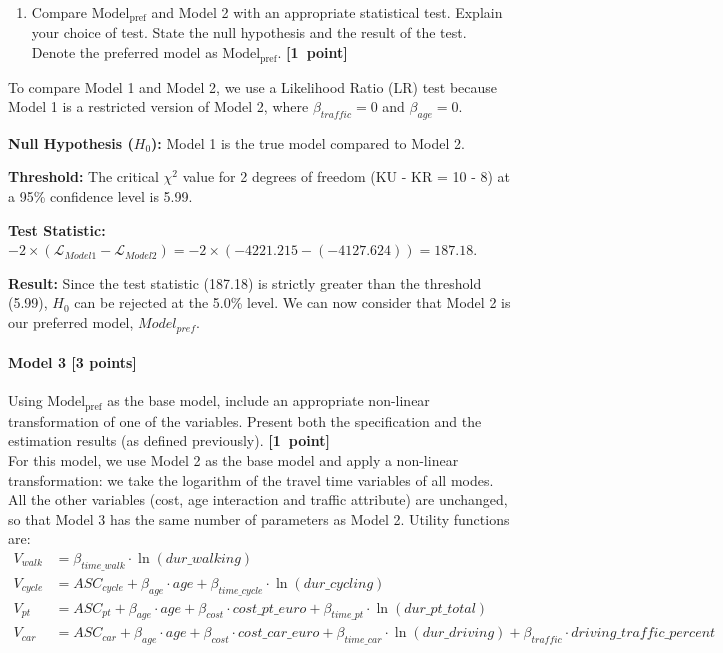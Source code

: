 \documentclass[11pt,a4paper]{article}
\begin{document}
\begin{enumerate}[resume]
	\item Compare $\text{Model}_\text{pref}$ and Model 2 with an appropriate statistical test. Explain your choice of test. State the null hypothesis and the result of the test. Denote the preferred model as $\text{Model}_\text{pref}$. \textbf{[1~point]}
\end{enumerate}

To compare Model 1 and Model 2, we use a Likelihood Ratio (LR) test because Model 1 is a restricted version of Model 2, where $\beta_{traffic} = 0$ and $\beta_{age} = 0$.
\begin{description}
    \item \textbf{Null Hypothesis ($H_0$):} Model 1 is the true model compared to Model 2.
    \item \textbf{Threshold:} The critical $\chi^2$ value for 2 degrees of freedom (KU - KR = 10 - 8) at a 95\% confidence level is 5.99.
    \item \textbf{Test Statistic:} $-2 \times (\mathcal{L}_{Model1} - \mathcal{L}_{Model2}) = -2 \times (-4221.215 - (-4127.624)) = 187.18$.
    \item \textbf{Result:} Since the test statistic (187.18) is strictly greater than the threshold (5.99), $H_0$ can be rejected at the 5.0\% level. 
We can now consider that Model 2 is our preferred model, $Model_{pref}$. 
\end{description}

\paragraph{Model 3 [3 points]} Using $\text{Model}_\text{pref}$ as the base model, include an appropriate non-linear transformation of one of the variables. Present both the specification and the estimation results (as defined previously). \textbf{[1~point]}\\

For this model, we use Model 2 as the base model and apply a non-linear transformation: we take the logarithm of the travel time variables of all modes. All the other variables (cost, age interaction and traffic attribute) are unchanged, so that Model 3 has the same number of parameters as Model 2.
Utility functions are:
\begin{align*}
    V_{walk} &= \beta_{time\_walk} \cdot \ln(dur\_walking) \\
    V_{cycle} &= ASC_{cycle} + \beta_{age} \cdot age + \beta_{time\_cycle} \cdot \ln(dur\_cycling) \\
    V_{pt} &= ASC_{pt} + \beta_{age} \cdot age + \beta_{cost} \cdot cost\_pt\_euro + \beta_{time\_pt} \cdot \ln(dur\_pt\_total) \\
    V_{car} &= ASC_{car} + \beta_{age} \cdot age + \beta_{cost} \cdot cost\_car\_euro + \beta_{time\_car} \cdot \ln(dur\_driving) + \beta_{traffic} \cdot driving\_traffic\_percent
\end{align*}
 
\end{document}
